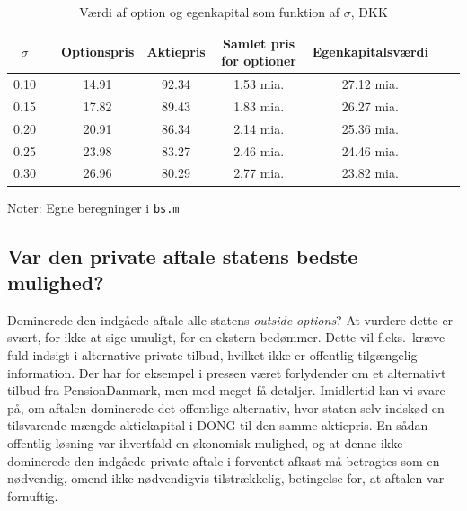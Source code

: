\documentclass{article}
\begin{document}
\begin{table}[h]
	\caption{V\ae{}rdi af option og egenkapital som funktion af $\sigma$, DKK}
	\label{tab:vary_sigma}
	\begin{tabularx}{\linewidth}{cXcccccr}
	\toprule[1pt] 
	$\sigma$  && Optionspris & Aktiepris & Samlet pris for optioner &Egenkapitalsv\ae{}rdi \\ \hline 
	0.10 && 14.91 & 92.34 & 1.53 mia. & 27.12 mia. \\
	0.15 && 17.82 & 89.43 & 1.83 mia. & 26.27 mia. \\
	0.20 && 20.91 & 86.34 & 2.14 mia. & 25.36 mia. \\
	0.25 && 23.98 & 83.27 & 2.46 mia. & 24.46 mia. \\
	0.30 && 26.96 & 80.29 & 2.77 mia. & 23.82 mia. \\
	\bottomrule[1pt]
	\end{tabularx}
	\begin{minipage}{\linewidth}
		\footnotesize{Noter: Egne beregninger i \texttt{bs.m} }
	\end{minipage}
\end{table}

\subsection{Var den private aftale statens bedste mulighed?}

Dominerede den indgåede aftale alle statens \emph{outside options}? At vurdere dette er svært, for ikke at sige umuligt, for en ekstern bedømmer. Dette vil f.eks.\ kræve fuld indsigt i alternative private tilbud, hvilket ikke er offentlig tilgængelig information. Der har for eksempel i pressen været forlydender om et alternativt tilbud fra PensionDanmark, men med meget få detaljer. Imidlertid kan vi svare på, om aftalen dominerede det offentlige alternativ, hvor staten selv indskød en tilsvarende mængde aktiekapital i DONG til den samme aktiepris. En sådan offentlig løsning var ihvertfald en økonomisk mulighed, og at denne ikke dominerede den indgåede private aftale i forventet afkast må betragtes som en nødvendig, omend ikke nødvendigvis tilstrækkelig, betingelse for, at aftalen var fornuftig. 
\end{document}
